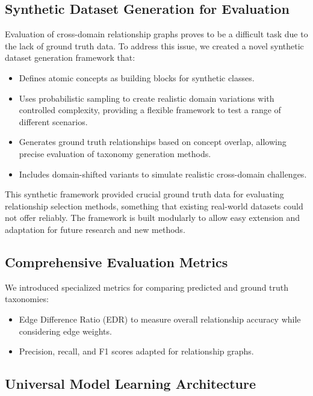 \subsection{Synthetic Dataset Generation for Evaluation}

Evaluation of cross-domain relationship graphs proves to be a difficult task due to the lack of ground truth data.
To address this issue, we created a novel synthetic dataset generation framework that:

\begin{itemize}
    \item Defines atomic concepts as building blocks for synthetic classes.
    \item Uses probabilistic sampling to create realistic domain variations
          with controlled complexity,
          providing a flexible framework to test a range of different scenarios.
    \item Generates ground truth relationships based on concept overlap,
          allowing precise evaluation of taxonomy generation methods.
    \item Includes domain-shifted variants to simulate realistic cross-domain challenges.
\end{itemize}

This synthetic framework provided crucial ground truth data for evaluating relationship selection methods,
something that existing real-world datasets could not offer reliably.
The framework is built modularly to allow easy extension and adaptation for future research
and new methods.

\subsection{Comprehensive Evaluation Metrics}

We introduced specialized metrics for comparing predicted and ground truth taxonomies:

\begin{itemize}
    \item Edge Difference Ratio (EDR) to measure overall relationship accuracy
          while considering edge weights.
    \item Precision, recall, and F1 scores adapted for relationship graphs.
\end{itemize}

\subsection{Universal Model Learning Architecture}

